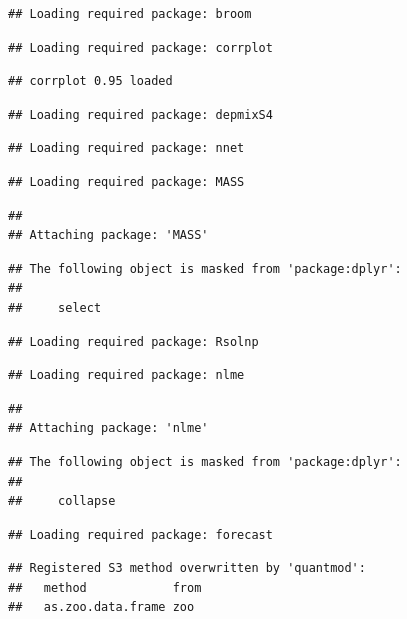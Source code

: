 \documentclass[
]{article}
\begin{document}
\begin{verbatim}
## Loading required package: broom
\end{verbatim}

\begin{verbatim}
## Loading required package: corrplot
\end{verbatim}

\begin{verbatim}
## corrplot 0.95 loaded
\end{verbatim}

\begin{verbatim}
## Loading required package: depmixS4
\end{verbatim}

\begin{verbatim}
## Loading required package: nnet
\end{verbatim}

\begin{verbatim}
## Loading required package: MASS
\end{verbatim}

\begin{verbatim}
## 
## Attaching package: 'MASS'
\end{verbatim}

\begin{verbatim}
## The following object is masked from 'package:dplyr':
## 
##     select
\end{verbatim}

\begin{verbatim}
## Loading required package: Rsolnp
\end{verbatim}

\begin{verbatim}
## Loading required package: nlme
\end{verbatim}

\begin{verbatim}
## 
## Attaching package: 'nlme'
\end{verbatim}

\begin{verbatim}
## The following object is masked from 'package:dplyr':
## 
##     collapse
\end{verbatim}

\begin{verbatim}
## Loading required package: forecast
\end{verbatim}

\begin{verbatim}
## Registered S3 method overwritten by 'quantmod':
##   method            from
##   as.zoo.data.frame zoo
\end{verbatim}
\end{document}
